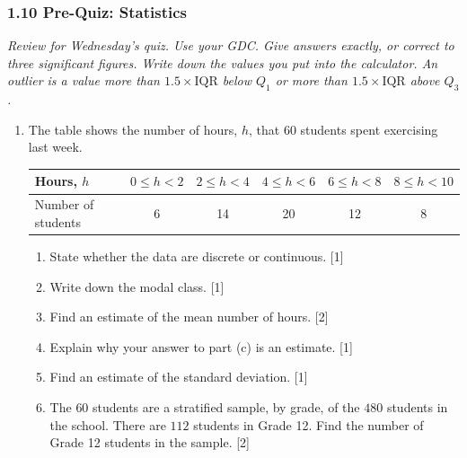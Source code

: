 \documentclass[12pt, twoside]{article}
\begin{document}
\subsubsection*{1.10 Pre-Quiz: Statistics}

\emph{Review for Wednesday's quiz. Use your GDC. Give answers exactly, or
correct to three significant figures. Write down the values you put into
the calculator. An outlier is a value more than $1.5 \times \text{IQR}$
below $Q_{1}$ or more than $1.5 \times \text{IQR}$ above $Q_{3}$.}

\begin{enumerate}[itemsep=0.15cm]

\item[1.] [Maximum mark: 8]

The table shows the number of hours, $h$, that $60$ students spent
exercising last week.

\begin{center}
\setlength{\tabcolsep}{5pt}\renewcommand{\arraystretch}{1.2}
\begin{tabular}{|l|c|c|c|c|c|}
\hline
Hours, $h$ & $0 \le h < 2$ & $2 \le h < 4$ & $4 \le h < 6$ & $6 \le h < 8$ & $8 \le h < 10$ \\
\hline
Number of students & 6 & 14 & 20 & 12 & 8 \\
\hline
\end{tabular}
\end{center}

\begin{enumerate}[itemsep=0.1cm]
  \item State whether the data are discrete or continuous. \hfill [1]
  \item Write down the modal class. \hfill [1]
  \item Find an estimate of the mean number of hours. \hfill [2]
  \item Explain why your answer to part (c) is an estimate. \hfill [1]
  \item Find an estimate of the standard deviation. \hfill [1]
  \item The $60$ students are a stratified sample, by grade, of the $480$
  students in the school. There are $112$ students in Grade 12. Find the
  number of Grade 12 students in the sample. \hfill [2]
\end{enumerate}


\end{enumerate}
\end{document}
